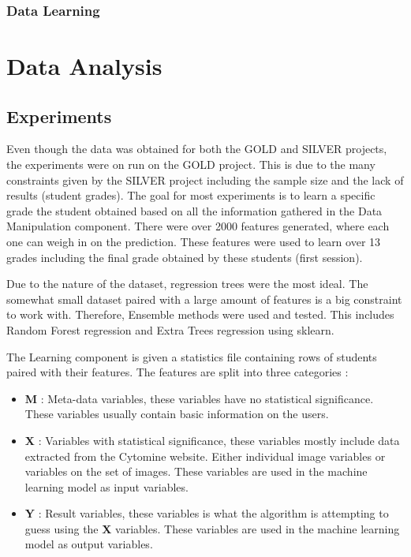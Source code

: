 \documentclass[a4paper,11pt]{report}
\numberwithin{figure}{section} %
\begin{document}
    \subsubsection{Data Learning}


\section{Data Analysis}

	\subsection{Experiments}
    
    
    Even though the data was obtained for both the GOLD and SILVER projects, the experiments were on run on the GOLD project.
    This is due to the many constraints given by the SILVER project including the sample size and the lack of results (student grades).
    The goal for most experiments is to learn a specific grade the student obtained based on all the information gathered in the Data Manipulation component.
    There were over 2000 features generated, where each one can weigh in on the prediction.
    These features were used to learn over 13 grades including the final grade obtained by these students (first session).\newline
    
    
    Due to the nature of the dataset, regression trees were the most ideal.
    The somewhat small dataset paired with a large amount of features is a big constraint to work with.
    Therefore, Ensemble methods were used and tested.
    This includes Random Forest regression and Extra Trees regression using sklearn.\newline
    
    The Learning component is given a statistics file containing rows of students paired with their features.
    The features are split into three categories :
    \begin{itemize}
\item[\textbullet] \textbf{M} : Meta-data variables, these variables have no statistical significance.
These variables usually contain basic information on the users.\\
\item[\textbullet] \textbf{X} : Variables with statistical significance, these variables mostly include data extracted from the Cytomine website.
Either individual image variables or variables on the set of images.
These variables are used in the machine learning model as input variables.\\
\item[\textbullet] \textbf{Y} : Result variables, these variables is what the algorithm is attempting to guess using the  \textbf{X} variables.
These variables are used in the machine learning model as output variables.\\
\end{itemize}
    
\end{document}
